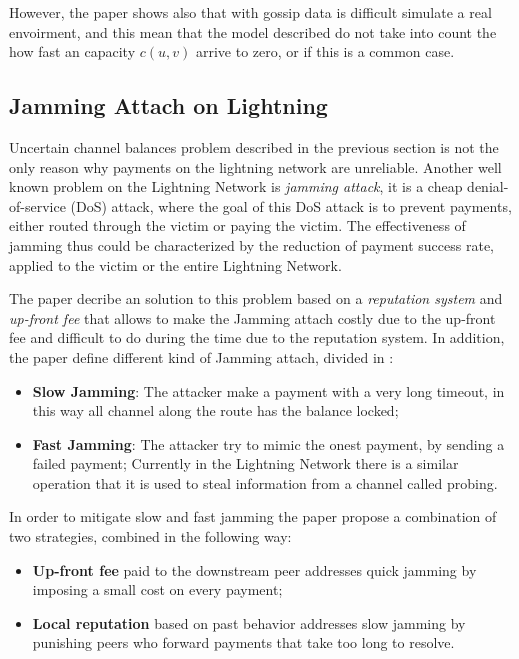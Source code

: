 However, the paper shows also that with gossip data is difficult simulate 
a real envoirment, and this mean that the model described do not take into 
count the how fast an capacity $c(u, v)$ arrive to zero, or if this is a 
common case.

\subsection{Jamming Attach on Lightning}

Uncertain channel balances problem described in the previous section 
is not the only reason why payments on the lightning network are unreliable.
Another well known problem on the Lightning Network is \emph{jamming attack},
it is a cheap denial-of-service (DoS) attack, where the goal of this DoS attack 
is to prevent payments, either routed through the victim or paying the victim. 
The effectiveness of jamming thus could be characterized by the reduction of 
payment success rate, applied to the victim or the entire Lightning Network.

The paper \cite{cryptoeprint:2022/1454} decribe an solution to this problem 
based on a \emph{reputation system} and \emph{up-front fee} that allows to make
the Jamming attach costly due to the up-front fee and difficult to do during the time 
due to the reputation system.
In addition, the paper define different kind of Jamming attach, divided in :

\begin{itemize}
    \item {\bf Slow Jamming}: The attacker make a payment with a very long timeout, 
        in this way all channel along the route has the balance locked;
    \item {\bf Fast Jamming}: The attacker try to mimic the onest payment, by sending
        a failed payment; Currently in the Lightning Network there is a similar operation
        that it is used to steal information from a channel called probing.
\end{itemize}

In order to mitigate slow and fast jamming the paper \cite{cryptoeprint:2022/1454}
propose a combination of two strategies, combined in the following way:

\begin{itemize}
    \item {\bf Up-front fee} paid to the downstream peer addresses quick jamming 
        by imposing a small cost on every payment;
    \item {\bf Local reputation} based on past behavior addresses slow jamming by 
        punishing peers who forward payments that take too long to resolve.
\end{itemize}

